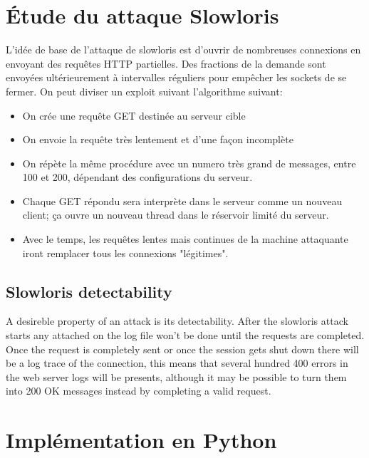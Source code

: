 \documentclass{article}
\begin{document}
\section{Étude du attaque Slowloris}
L'idée de base de l'attaque de slowloris est d'ouvrir de nombreuses connexions en envoyant des requêtes HTTP partielles. Des fractions de la demande sont envoyées ultérieurement à intervalles réguliers pour empêcher les sockets de se fermer.
On peut diviser un exploit suivant l'algorithme suivant:

\begin{itemize}
	\item On crée une requête GET destinée au serveur cible
	\item On envoie la requête très lentement et d'une façon incomplète
	\item On répète la même procédure avec un numero très grand de messages, entre 100 et 200, dépendant des configurations du serveur.
	\item Chaque GET répondu sera interprète dans le serveur comme un nouveau client; ça ouvre un nouveau thread dans le réservoir limité du serveur.
	\item Avec le temps, les requêtes lentes mais continues de la machine attaquante iront remplacer tous les connexions "légitimes".
\end{itemize}

\subsection{Slowloris detectability}
A desireble property of an attack is its detectability. After the slowloris attack starts any attached on the log file won't be done until the requests are completed. Once the request is completely sent or once the session gets shut down there will be a log trace of the connection, this means that several hundred 400 errors in the web server logs will be presents,  although it may be possible to turn them into 200 OK messages instead by completing a valid request.

\section{Implémentation en Python}
\end{document}
